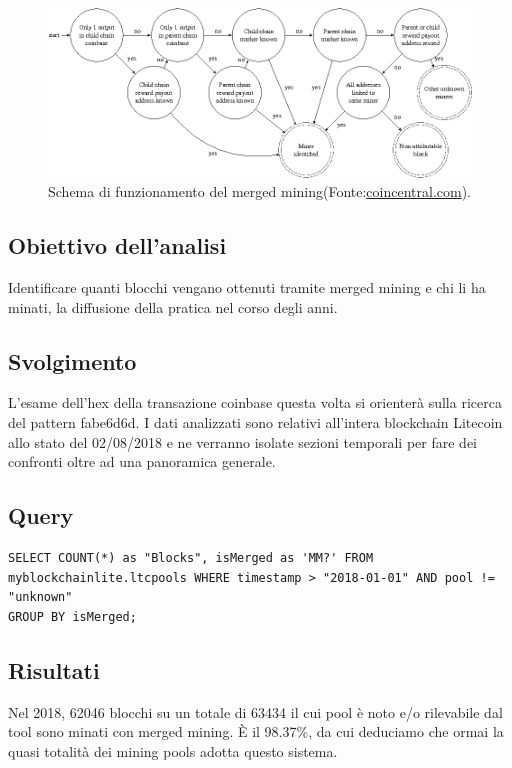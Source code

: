 \begin{figure}
	\centering
	\includegraphics[width=1.0\linewidth]{images/mergedminingdiagramsemanticscholar}
	\caption{Schema di funzionamento del merged mining(Fonte:\url{coincentral.com}).}
	\label{fig:mergedminingdiagramsemanticscholar}
\end{figure}

\subsection{Obiettivo dell’analisi}
Identificare quanti blocchi vengano ottenuti tramite merged mining e chi li ha minati, la diffusione della pratica nel corso degli anni.
\subsection{Svolgimento}
L’esame dell’hex della transazione coinbase questa volta si orienterà sulla ricerca del pattern fabe6d6d. I dati analizzati sono relativi all'intera blockchain Litecoin allo stato del 02/08/2018 e ne verranno isolate sezioni temporali per fare dei confronti oltre ad una panoramica generale.
\subsection{Query}

\begin{lstlisting}
SELECT COUNT(*) as "Blocks", isMerged as 'MM?' FROM myblockchainlite.ltcpools WHERE timestamp > "2018-01-01" AND pool != "unknown"
GROUP BY isMerged;
\end{lstlisting}

\subsection{Risultati}


Nel 2018, 62046 blocchi su un totale di 63434 il cui pool è noto e/o rilevabile dal tool sono minati con merged mining. È il 98.37\%, da cui deduciamo che ormai la quasi totalità dei mining pools adotta questo sistema.

